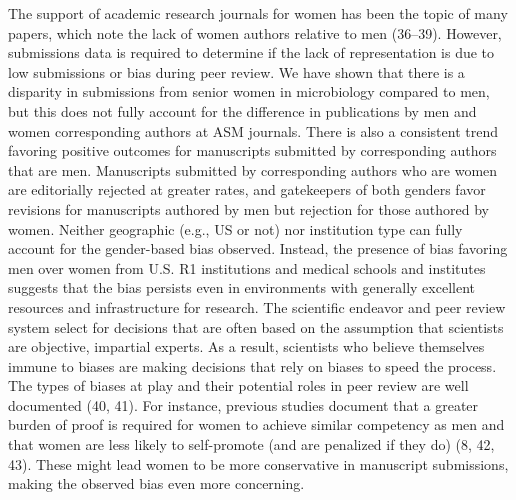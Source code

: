 \documentclass[11pt,]{article}
\begin{document}
The support of academic research journals for women has been the topic
of many papers, which note the lack of women authors relative to men
(36--39). However, submissions data is required to determine if the lack
of representation is due to low submissions or bias during peer review.
We have shown that there is a disparity in submissions from senior women
in microbiology compared to men, but this does not fully account for the
difference in publications by men and women corresponding authors at ASM
journals. There is also a consistent trend favoring positive outcomes
for manuscripts submitted by corresponding authors that are men.
Manuscripts submitted by corresponding authors who are women are
editorially rejected at greater rates, and gatekeepers of both genders
favor revisions for manuscripts authored by men but rejection for those
authored by women. Neither geographic (e.g., US or not) nor institution
type can fully account for the gender-based bias observed. Instead, the
presence of bias favoring men over women from U.S. R1 institutions and
medical schools and institutes suggests that the bias persists even in
environments with generally excellent resources and infrastructure for
research. The scientific endeavor and peer review system select for
decisions that are often based on the assumption that scientists are
objective, impartial experts. As a result, scientists who believe
themselves immune to biases are making decisions that rely on biases to
speed the process. The types of biases at play and their potential roles
in peer review are well documented (40, 41). For instance, previous
studies document that a greater burden of proof is required for women to
achieve similar competency as men and that women are less likely to
self-promote (and are penalized if they do) (8, 42, 43). These might
lead women to be more conservative in manuscript submissions, making the
observed bias even more concerning.
\end{document}
